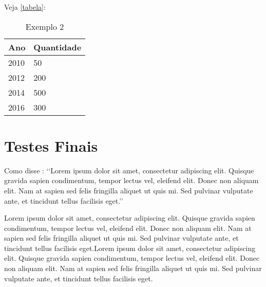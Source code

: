 \begin{table}[!ht]	
		\centering
\end{table}


\lipsum[24] Veja \autoref{tabela}:

\begin{table}[!ht]
\centering
\caption{Exemplo 2}
\label{tabela}
\begin{tabular}{ll}
\hline
\textbf{Ano} & \textbf{Quantidade} \\ \hline
2010         & 50                  \\ \hline
2012         & 200                 \\ \hline
2014         & 500                 \\ \hline
2016         & 300                 \\ \hline
\end{tabular}
\end{table}

\section{Testes Finais}

Como disse : \lq\lq Lorem ipsum dolor sit amet, consectetur adipiscing elit. Quisque gravida sapien condimentum, tempor lectus vel, eleifend elit. Donec non aliquam elit. Nam at sapien sed felis fringilla aliquet ut quis mi. Sed pulvinar vulputate ante, et tincidunt tellus facilisis eget.\rq\rq

\begin{citacao}
Lorem ipsum dolor sit amet, consectetur adipiscing elit. Quisque gravida sapien condimentum, tempor lectus vel, eleifend elit. Donec non aliquam elit. Nam at sapien sed felis fringilla aliquet ut quis mi. Sed pulvinar vulputate ante, et tincidunt tellus facilisis eget.Lorem ipsum dolor sit amet, consectetur adipiscing elit. Quisque gravida sapien condimentum, tempor lectus vel, eleifend elit. Donec non aliquam elit. Nam at sapien sed felis fringilla aliquet ut quis mi. Sed pulvinar vulputate ante, et tincidunt tellus facilisis eget.
\end{citacao}

\lipsum[90-91]